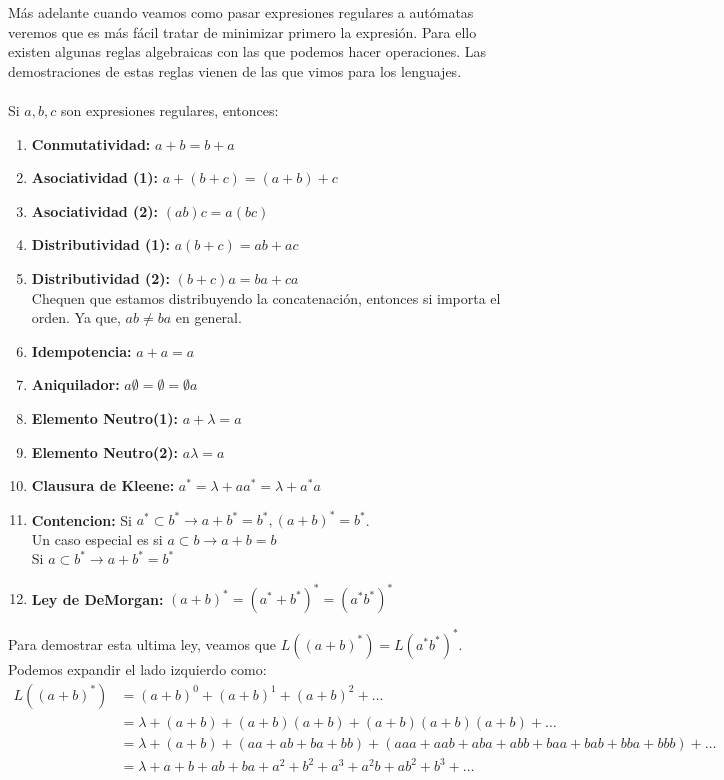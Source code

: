 Más adelante cuando veamos como pasar expresiones regulares a autómatas veremos que es más fácil tratar de minimizar primero la expresión. Para 
ello existen algunas reglas algebraicas con las que podemos hacer operaciones. Las demostraciones de estas reglas vienen de las que vimos para los lenguajes.
\\ \\
Si $a,b,c$ son expresiones regulares, entonces:

\begin{enumerate}
    \item \textbf{Conmutatividad:} $a + b = b + a$
    \item \textbf{Asociatividad (1):} $a + (b + c) = (a + b) + c$
    \item \textbf{Asociatividad (2):} $(ab)c = a(bc)$
    \item \textbf{Distributividad (1):} $a(b + c) = ab + ac$
    \item \textbf{Distributividad (2):} $(b+c)a = ba + ca$
    \\ Chequen que estamos distribuyendo la concatenación, entonces si importa el orden. Ya que, $ab \neq ba$ en general.
    \item \textbf{Idempotencia:} $a + a = a$
    \item \textbf{Aniquilador:} $a\emptyset = \emptyset = \emptyset a$
    \item \textbf{Elemento Neutro(1):} $a + \lambda = a$
    \item \textbf{Elemento Neutro(2):} $a\lambda = a$
    \item \textbf{Clausura de Kleene:} $a^* = \lambda + aa^* = \lambda + a^*a$
    \item \textbf{Contencion:} Si $ a^* \subset b^* \rightarrow a + b^* = b^*, (a+b)^* = b^*$.
    \\ Un caso especial es si $a \subset b \rightarrow a + b = b$
    \\ Si $a \subset b^* \rightarrow a + b^* = b^*$
    \item \textbf{Ley de DeMorgan:} $(a + b)^* = (a^* + b^*)^* = (a^*b^*)^*$
\end{enumerate}

Para demostrar esta ultima ley, veamos que $L((a+b)^*) = L(a^*b^*)^*$. Podemos expandir el lado izquierdo como:
\begin{align*}
    L((a+b)^*) &= (a+b)^0 + (a+b)^1 + (a+b)^2 + \dots \\
    &= \lambda + (a+b) + (a+b)(a+b) + (a+b)(a+b)(a+b) + \dots \\
    &= \lambda + (a+b) + (aa + ab + ba + bb) + (aaa + aab + aba + abb + baa + bab + bba + bbb) + \dots \\
    &= \lambda + a + b + ab + ba + a^2 + b^2 + a^3 + a^2b + ab^2 + b^3 + \dots
\end{align*}

